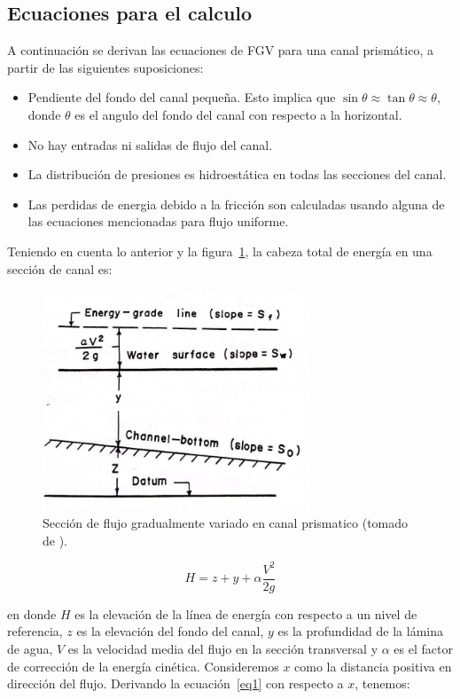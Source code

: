\documentclass[11pt, oneside]{article}
\begin{document}
\subsection{Ecuaciones para el calculo} 
A continuaci\'on se derivan las ecuaciones de FGV para una canal prism\'atico, a partir de las siguientes suposiciones:
\begin{itemize}
    \item Pendiente del fondo del canal pequeña. Esto implica que $\sin \theta \approx \tan \theta \approx \theta$, donde $\theta$ es el angulo del fondo del canal con respecto a la horizontal. 
    \item No hay entradas ni salidas de flujo del canal.
    \item La distribuci\'on de presiones es hidroest\'atica en todas las secciones del canal.
    \item Las perdidas de energia debido a la fricci\'on son calculadas usando alguna de las ecuaciones mencionadas para flujo uniforme.
\end{itemize}
Teniendo en cuenta lo anterior y la figura~\ref{fig1}, la cabeza total de energ\'ia en una secci\'on de canal es:
\begin{figure}[h]
\centering
\includegraphics[width=8cm]{fig51.jpeg}
\caption{Secci\'on de flujo gradualmente variado en canal prismatico (tomado de \cite{Chau}).}
\label{fig1}
\end{figure}

\begin{equation}
    H = z + y + \alpha\frac{ V^2}{2g}
\label{eq1}
\end{equation}

en donde $H$ es la elevaci\'on de la l\'inea de energ\'ia con respecto a un nivel de referencia, $z$ es la elevaci\'on del fondo del canal, $y$ es la profundidad de la l\'amina de agua, $V$ es la velocidad media del flujo en la secci\'on transversal y $\alpha$ es el factor de correcci\'on de la energ\'ia cin\'etica. Consideremos $x$ como la distancia  positiva en direcci\'on del flujo. Derivando la ecuaci\'on~\ref{eq1} con respecto a $x$, tenemos:
\end{document}
